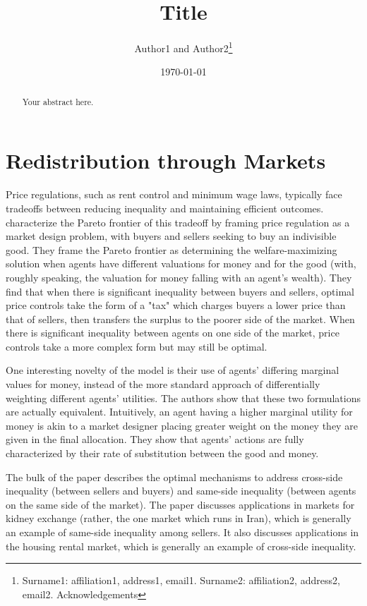 \documentclass[JEL]{AEA}
\begin{document}
\title{Title}
\author{Author1 and Author2\thanks{%
Surname1: affiliation1, address1, email1. Surname2: affiliation2, address2,
email2. Acknowledgements}}
\date{\today}
\JEL{}
\Keywords{}

\begin{abstract}
Your abstract here.
\end{abstract}

\maketitle

\section{Redistribution through Markets}

Price regulations, such as rent control and minimum wage laws, typically face tradeoffs between reducing inequality and maintaining efficient outcomes. \cite{dworczak-2020} characterize the Pareto frontier of this tradeoff by framing price regulation as a market design problem, with buyers and sellers seeking to buy an indivisible good. They frame the Pareto frontier as determining the welfare-maximizing solution when agents have different valuations for money and for the good (with, roughly speaking, the valuation for money falling with an agent's wealth). They find that when there is significant inequality between buyers and sellers, optimal price controls take the form of a "tax" which charges buyers a lower price than that of sellers, then transfers the surplus to the poorer side of the market. When there is significant inequality between agents on one side of the market, price controls take a more complex form but may still be optimal.

One interesting novelty of the \cite{dworczak-2020} model is their use of agents' differing marginal values for money, instead of the more standard approach of differentially weighting different agents' utilities. The authors show that these two formulations are actually equivalent. Intuitively, an agent having a higher marginal utility for money is akin to a market designer placing greater weight on the money they are given in the final allocation. They show that agents' actions are fully characterized by their rate of substitution between the good and money.

The bulk of the paper describes the optimal mechanisms to address cross-side inequality (between sellers and buyers) and same-side inequality (between agents on the same side of the market). The paper discusses applications in markets for kidney exchange (rather, the one market which runs in Iran), which is generally an example of same-side inequality among sellers. It also discusses applications in the housing rental market, which is generally an example of cross-side inequality.
\end{document}
